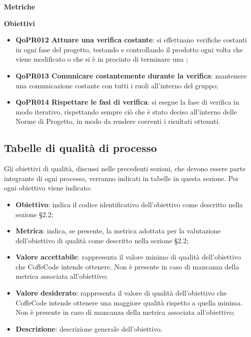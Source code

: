 \documentclass[../piano-di-qualifica.tex]{subfiles}
\begin{document}
\textbf{Metriche}

\textbf{Obiettivi}
\begin{itemize}
    \item \textbf{QoPR012 Attuare una verifica costante}: si effettuano verifiche costanti in ogni fase del progetto, testando e controllando il prodotto ogni volta che viene modificato o che si è in procinto di terminare una ;
    \item \textbf{QoPR013 Comunicare costantemente durante la verifica}: mantenere una comunicazione costante con tutti i ruoli all'interno del gruppo;
    \item \textbf{QoPR014 Rispettare le fasi di verifica}: si esegue la fase di verifica in modo iterativo, rispettando sempre ciò che è stato deciso all'interno delle Norme di Progetto, in modo da rendere coerenti i risultati ottenuti.
\end{itemize}

\subsection{Tabelle di qualità di processo}
\label{sub:tabelle_di_qualita_di_processo}
Gli obiettivi di qualità, discussi nelle precedenti sezioni, che devono essere parte integrante di ogni processo, verranno indicati in tabelle in questa sezione.
Per ogni obiettivo viene indicato:

\begin{itemize}
   \item \textbf{Obiettivo}: indica il codice identificativo dell'obiettivo come descritto nella sezione §2.2;
   \item \textbf{Metrica}: indica, se presente, la metrica adottata per la valutazione dell'obiettivo di qualità come descritto nella sezione §2.2;
   \item \textbf{Valore accettabile}: rappresenta il valore minimo di qualità dell'obiettivo che CoffeCode intende ottenere. Non è presente in caso di mancanza della metrica associata all'obiettivo;
   \item \textbf{Valore desiderato}: rappresenta il valore di qualità dell'obiettivo che CoffeCode intende ottenere una maggiore qualità rispetto a quella minima. Non è presente in caso di mancanza della metrica associata all'obiettivo;
   \item \textbf{Descrizione}: descrizione generale dell'obiettivo.
\end{itemize}
\end{document}

